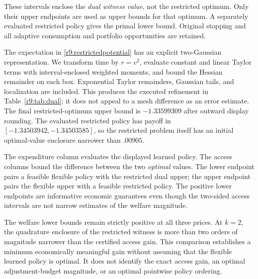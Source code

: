 \begin{table}[t]
\centering\small
\caption{Refining the no-adjustment dual witness}\label{r9:tab:dual}

\par\smallskip\footnotesize These intervals enclose the \emph{dual witness value}, not the restricted optimum. Only their upper endpoints are used as upper bounds for that optimum. A separately evaluated restricted policy gives the primal lower bound. Original stopping and all adaptive consumption and portfolio opportunities are retained.
\end{table}

The expectation in \eqref{r9:restrictedpotential} has an explicit two-Gaussian representation. We transform time by $r=v^2$, evaluate constant and linear Taylor terms with interval-enclosed weighted moments, and bound the Hessian remainder on each box. Exponential Taylor remainders, Gaussian tails, and localization are included. This produces the executed refinement in Table~\ref{r9:tab:dual}; it does not appeal to a mesh difference as an error estimate. The final restricted-optimum upper bound is $-1.33599309$ after outward display rounding. The evaluated restricted policy has payoff in $[-1.34503942,-1.34503585]$, so the restricted problem itself has an initial optimal-value enclosure narrower than $.00905$.

\begin{table}[t]
\centering\scriptsize
\caption{Certified original-model expenditures and value of access}\label{r9:tab:economics}

\par\smallskip\footnotesize The expenditure column evaluates the displayed learned policy. The access columns bound the difference between the two \emph{optimal} values. The lower endpoint pairs a feasible flexible policy with the restricted dual upper; the upper endpoint pairs the flexible upper with a feasible restricted policy. The positive lower endpoints are informative economic guarantees even though the two-sided access intervals are not narrow estimates of the welfare magnitude.
\end{table}

The welfare lower bounds remain strictly positive at all three prices. At $k=2$, the quadrature enclosure of the restricted witness is more than two orders of magnitude narrower than the certified access gain. This comparison establishes a minimum economically meaningful gain without assuming that the flexible learned policy is optimal. It does not identify the exact access gain, an optimal adjustment-budget magnitude, or an optimal pointwise policy ordering.

